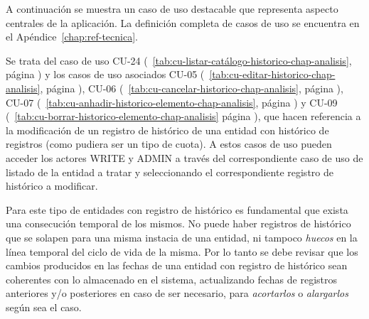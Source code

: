 A continuación se muestra un caso de uso destacable que representa
aspecto centrales de la aplicación. La definición completa de casos de uso se encuentra en el Apéndice~\ref{chap:ref-tecnica}. 

Se trata del caso de uso CU-24 (\tablename~\ref{tab:cu-listar-catálogo-historico-chap-analisis}, página \pageref{tab:cu-listar-catálogo-historico-chap-analisis}) y los casos de uso asociados  CU-05 (\tablename~\ref{tab:cu-editar-historico-chap-analisis}, página \pageref{tab:cu-editar-historico-chap-analisis}), CU-06 (\tablename~\ref{tab:cu-cancelar-historico-chap-analisis}, página \pageref{tab:cu-cancelar-historico-chap-analisis}), CU-07 (\tablename~\ref{tab:cu-anhadir-historico-elemento-chap-analisis}, página \pageref{tab:cu-anhadir-historico-elemento-chap-analisis}) y CU-09 (\tablename~\ref{tab:cu-borrar-historico-elemento-chap-analisis} página \pageref{tab:cu-borrar-historico-elemento-chap-analisis}), que hacen referencia a la modificación de un registro de histórico de una entidad con histórico de registros (como pudiera ser un tipo de cuota). A estos casos de uso pueden acceder los actores WRITE y ADMIN a través del correspondiente caso de uso de listado de la entidad a tratar y seleccionando el correspondiente registro de histórico a modificar.

Para este tipo de entidades con registro de histórico es fundamental que exista una consecución temporal de los mismos. No puede haber registros de histórico que se solapen para una misma instacia de una entidad, ni tampoco \textit{huecos} en la línea temporal del ciclo de vida de la misma. Por lo tanto se debe revisar que los cambios producidos en las fechas de una entidad con registro de histórico sean coherentes con lo almacenado en el sistema, actualizando fechas de registros anteriores y/o posteriores en caso de ser necesario, para \textit{acortarlos} o \textit{alargarlos} según sea el caso.


